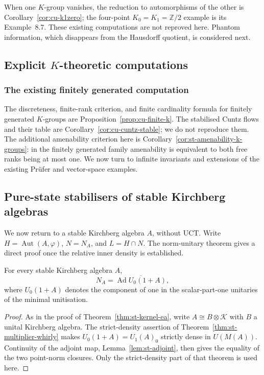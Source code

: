 When one \(K\)-group vanishes, the reduction to automorphisms of the
other is Corollary~\ref{cor:cu-k1zero}; the four-point
\(K_0=K_1=\mathbb Z/2\) example is its Example~8.7. These existing computations
are not reproved here. Phantom information, which disappears from the
Hausdorff quotient, is considered next.


\subsection{Explicit \(K\)-theoretic computations}

\label{sec:st-computations}


\subsubsection{The existing finitely generated computation}
The discreteness, finite-rank criterion, and finite cardinality formula
for finitely generated \(K\)-groups are
Proposition~\ref{prop:cu-finite-k}. The stabilised Cuntz flows and
their table are Corollary~\ref{cor:cu-cuntz-stable}; we do not reproduce
them. The additional amenability criterion here is
Corollary~\ref{cor:st-amenability-k-groups}: in the finitely generated
family amenability is equivalent to both free ranks being at most one.
We now turn to infinite invariants and extensions of the existing
Pr\"ufer and vector-space examples.


\subsection{Pure-state stabilisers of stable Kirchberg algebras}\label{sec:st-stable-stabilizers}

We now return to a stable Kirchberg algebra $A$, without UCT. Write $H=\operatorname{Aut} (A,\varphi)$, $N=N_A$, and $L=H\cap N$. The norm-unitary theorem gives a direct proof once the relative inner density is established.

\begin{lemma}\label{lem:st-stable-u0-density}
 For every stable Kirchberg algebra $A$, 
\begin{equation*}
N_A=\overline{\operatorname{Ad} U_0(1+A)}, 
\end{equation*}
where $U_0(1+A)$ denotes the component of one in the scalar-part-one
unitaries of the minimal unitisation.
\end{lemma}

\begin{proof}
As in the proof of Theorem~\ref{thm:st-kernel-ea}, write
$A\cong B\otimes\mathcal K$ with $B$ a unital Kirchberg algebra.
The strict-density assertion of Theorem~\ref{thm:st-multiplier-whirly}
makes $U_0(1+A)=U_1(A)_0$ strictly dense in $U(M(A))$.
Continuity of the adjoint map, Lemma~\ref{lem:st-adjoint}, then gives
the equality of the two point-norm closures. Only the strict-density
part of that theorem is used here.
\end{proof}

